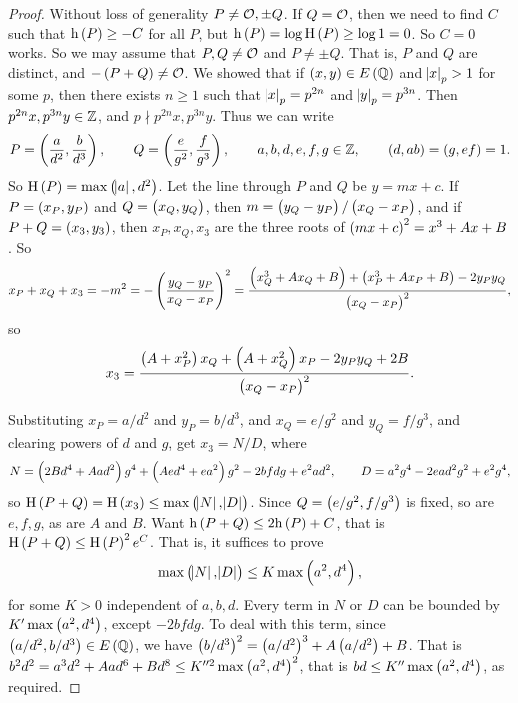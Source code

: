 \begin{proof}
Without loss of generality $ P \ne \mathcal{O}, \pm Q $. If $ Q = \mathcal{O} $, then we need to find $ C $ such that $ \h\br{P} \ge -C $ for all $ P $, but $ \h\br{P} = \log \H\br{P} \ge \log 1 = 0 $. So $ C = 0 $ works. So we may assume that $ P, Q \ne \mathcal{O} $ and $ P \ne \pm Q $. That is, $ P $ and $ Q $ are distinct, and $ -\br{P + Q} \ne \OOO $. We showed that if $ \br{x, y} \in E\br{\QQ} $ and $ \abs{x}_p > 1 $ for some $ p $, then there exists $ n \ge 1 $ such that $ \abs{x}_p = p^{2n} $ and $ \abs{y}_p = p^{3n} $. Then $ p^{2n}x, p^{3n}y \in \mathbb{Z} $, and $ p \nmid p^{2n}x, p^{3n}y $. Thus we can write
$$ P = \br{\dfrac{a}{d^2}, \dfrac{b}{d^3}}, \qquad Q = \br{\dfrac{e}{g^2}, \dfrac{f}{g^3}}, \qquad a, b, d, e, f, g \in \ZZ, \qquad \br{d, ab} = \br{g, ef} = 1. $$
So $ \H\br{P} = \max\br{\abs{a}, d^2} $. Let the line through $ P $ and $ Q $ be $ y = mx + c $. If $ P = \br{x_P, y_P} $ and $ Q = \br{x_Q, y_Q} $, then $ m = \br{y_Q - y_P} / \br{x_Q - x_P} $, and if $ P + Q = \br{x_3, y_3} $, then $ x_P, x_Q, x_3 $ are the three roots of $ \br{mx + c}^2 = x^3 + Ax + B $. So
$$ x_P + x_Q + x_3 = -m^2 = -\br{\dfrac{y_Q - y_P}{x_Q - x_P}}^2 = \dfrac{\br{x_Q^3 + Ax_Q + B} + \br{x_P^3 + Ax_P + B} - 2y_Py_Q}{\br{x_Q - x_P}^2}, $$
so
$$ x_3 = \dfrac{\br{A + x_P^2}x_Q + \br{A + x_Q^2}x_P - 2y_Py_Q + 2B}{\br{x_Q - x_P}^2}. $$

\pagebreak

Substituting $ x_P = a / d^2 $ and $ y_P = b / d^3 $, and $ x_Q = e / g^2 $ and $ y_Q = f / g^3 $, and clearing powers of $ d $ and $ g $, get $ x_3 = N / D $, where
$$ N = \br{2Bd^4 + Aad^2}g^4 + \br{Aed^4 + ea^2}g^2 - 2bfdg + e^2ad^2, \qquad D = a^2g^4 - 2ead^2g^2 + e^2g^4, $$
so $ \H\br{P + Q} = \H\br{x_3} \le \max\br{\abs{N}, \abs{D}} $. Since $ Q = \br{e / g^2, f / g^3} $ is fixed, so are $ e, f, g $, as are $ A $ and $ B $. Want $ \h\br{P + Q} \le 2\h\br{P} + C $, that is $ \H\br{P + Q} \le \H\br{P}^2e^C $. That is, it suffices to prove
$$ \max\br{\abs{N}, \abs{D}} \le K\max\br{a^2, d^4}, $$
for some $ K > 0 $ independent of $ a, b, d $. Every term in $ N $ or $ D $ can be bounded by $ K'\max\br{a^2, d^4} $, except $ -2bfdg $. To deal with this term, since $ \br{a / d^2, b / d^3} \in E\br{\QQ} $, we have $ \br{b / d^3}^2 = \br{a / d^2}^3 + A\br{a / d^2} + B $. That is $ b^2d^2 = a^3d^2 + Aad^6 + Bd^8 \le K''^2\max\br{a^2, d^4}^2 $, that is $ bd \le K''\max\br{a^2, d^4} $, as required.
\end{proof}


